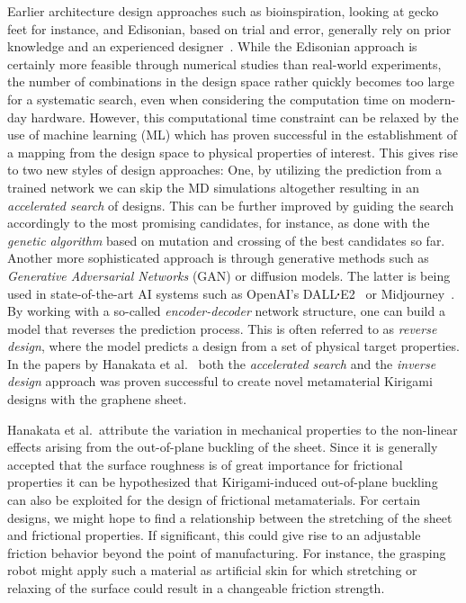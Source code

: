 Earlier architecture design approaches such as bioinspiration, looking at gecko
feet for instance, and Edisonian, based on trial and error, generally rely on
prior knowledge and an experienced designer~\cite{Mao}. While the Edisonian
approach is certainly more feasible through numerical studies than real-world
experiments, the number of combinations in the design space rather quickly
becomes too large for a systematic search, even when considering the computation
time on modern-day hardware. However, this computational time constraint can be
relaxed by the use of machine learning (\acrshort{ML}) which has proven
successful in the establishment of a mapping from the design space to physical
properties of interest. This gives rise to two new styles of design approaches:
One, by utilizing the prediction from a trained network we can skip the
\acrshort{MD} simulations altogether resulting in an \textit{accelerated search}
of designs. This can be further improved by guiding the search accordingly to
the most promising candidates, for instance, as done with the \textit{genetic
algorithm} based on mutation and crossing of the best candidates so far. Another
more sophisticated approach is through generative methods such as
\textit{Generative Adversarial Networks} (\acrshort{GAN}) or diffusion models.
The latter is being used in state-of-the-art AI systems such as OpenAI's
DALL$\sq$E2~\cite{DALLE} or Midjourney~\cite{Midjourney}. By working with a
so-called \textit{encoder-decoder} network structure, one can build a model that
reverses the prediction process. This is often referred to as \textit{reverse
design}, where the model predicts a design from a set of physical target
properties. In the papers by Hanakata et al.~\cite{PhysRevLett.121.255304,
PhysRevResearch.2.042006} both the \textit{accelerated search} and the
\textit{inverse design} approach was proven successful to create novel
metamaterial Kirigami designs with the graphene sheet. 

Hanakata et al.\ attribute the variation in mechanical properties to the
non-linear effects arising from the out-of-plane buckling of the sheet. Since it
is generally accepted that the surface roughness is of great importance for
frictional properties it can be hypothesized that Kirigami-induced out-of-plane
buckling can also be exploited for the design of frictional metamaterials. For
certain designs, we might hope to find a relationship between the stretching of
the sheet and frictional properties. If significant, this could give rise to an
adjustable friction behavior beyond the point of manufacturing. For instance,
the grasping robot might apply such a material as artificial skin for which
stretching or relaxing of the surface could result in a changeable friction
strength.

